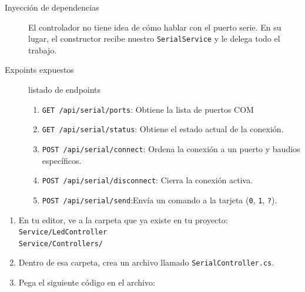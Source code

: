 \documentclass[
10pt, %
a4paper, %
oneside, %
headinclude,footinclude, %
BCOR5mm, %
]{scrartcl}
\begin{document}
\begin{description}
	\item[Inyección de dependencias] El controlador no tiene idea de cómo hablar con el puerto serie. En su lugar, el constructor recibe nuestro \texttt{SerialService} y le delega todo el trabajo.
	\item[Expoints expuestos] listado de endpoints
	\begin{enumerate}
		\item \texttt{GET /api/serial/ports}: Obtiene la lista de puertos COM
		\item \texttt{GET /api/serial/status}: Obtiene el estado actual de la conexión.
		\item \texttt{POST /api/serial/connect}: Ordena la conexión a un puerto y baudios específicos.
		\item \texttt{POST /api/serial/disconnect}: Cierra la conexión activa.
		\item \texttt{POST /api/serial/send}:Envía un comando a la tarjeta (\texttt{0}, \texttt{1}, \texttt{?}).
	\end{enumerate}
\end{description}

\begin{enumerate}
	\item En tu editor, ve a la carpeta que ya existe en tu proyecto: \texttt{Service/LedController\\Service/Controllers/}
	\item Dentro de esa carpeta, crea un archivo llamado \texttt{SerialController.cs}.
	\item Pega el siguiente código en el archivo:
\end{enumerate}
\end{document}
